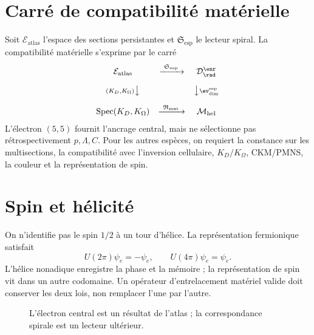 \section{Carré de compatibilité matérielle}

Soit \(\mathcal E_{\mathrm{atlas}}\) l'espace des sections persistantes et \(\mathfrak S_{\mathrm{esp}}\) le lecteur spiral. La compatibilité matérielle s'exprime par le carré
\[
\begin{array}{ccc}
\mathcal E_{\mathrm{atlas}}
 & \xrightarrow{\ \mathfrak S_{\mathrm{esp}}\ }
 & \mathcal D_{\rad}^{\enr}\\[1.0em]
{\scriptstyle (K_D,K_\Omega)}\big\downarrow
 && \big\downarrow{\scriptstyle \ev_{\mathrm{dim}}^{\mathrm{esp}}}\\[1.0em]
\operatorname{Spec}(K_D,K_\Omega)
 & \xrightarrow{\ \mathfrak R_{\mathrm{mat}}\ }
 & \mathcal M_{\mathrm{hel}}
\end{array}
\]
L'électron \((5,5)\) fournit l'ancrage central, mais ne sélectionne pas rétrospectivement \(p,\Lambda,C\). Pour les autres espèces, on requiert la constance sur les multisections, la compatibilité avec l'inversion cellulaire, \(K_D/K_\Omega\), CKM/PMNS, la couleur et la représentation de spin.

\section{Spin et hélicité}

On n'identifie pas le spin \(1/2\) à un tour d'hélice. La représentation fermionique satisfait
\[
 U(2\pi)\psi_e=-\psi_e,
 \qquad
 U(4\pi)\psi_e=\psi_e.
\]
L'hélice nonadique enregistre la phase et la mémoire ; la représentation de spin vit dans un autre codomaine. Un opérateur d'entrelacement matériel valide doit conserver les deux lois, non remplacer l'une par l'autre.

\begin{figure}[htbp]
\centering
{}
\caption{L'électron central est un résultat de l'atlas ; la correspondance spirale est un lecteur ultérieur.}
\label{espiral:fig:atlas-electron}
\end{figure}
